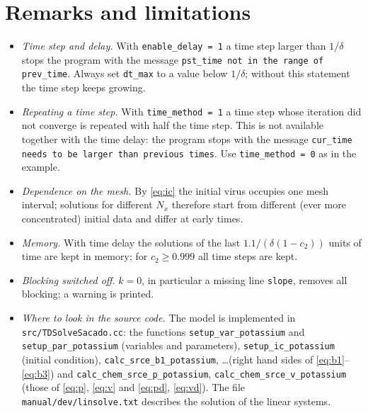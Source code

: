 \documentclass[11pt]{article}
\newcommand{\code}[1]{\texttt{#1}}
\begin{document}
\section{Remarks and limitations}
\label{sec:remarks}
\begin{itemize}
  \item \emph{Time step and delay.} With \code{enable\_delay = 1} a time step larger than $1/\delta$ stops the program with the message \code{pst\_time not in the range of prev\_time}. Always set \code{dt\_max} to a value below $1/\delta$; without this statement the time step keeps growing.
  \item \emph{Repeating a time step.} With \code{time\_method = 1} a time step whose iteration did not converge is repeated with half the time step. This is not available together with the time delay: the program stops with the message \code{cur\_time needs to be larger than previous times}. Use \code{time\_method = 0} as in the example.
  \item \emph{Dependence on the mesh.} By \eqref{eq:ic} the initial virus occupies one mesh interval; solutions for different $N_x$ therefore start from different (ever more concentrated) initial data and differ at early times.
  \item \emph{Memory.} With time delay the solutions of the last $1.1/(\delta(1-c_2))$ units of time are kept in memory; for $c_2\ge0.999$ all time steps are kept.
  \item \emph{Blocking switched off.} $k=0$, in particular a missing line \code{slope}, removes all blocking; a warning is printed.
  \item \emph{Where to look in the source code.} The model is implemented in \code{src/TDSolveSacado.cc}: the functions \code{setup\_var\_potassium} and \code{setup\_par\_potassium} (variables and parameters), \code{setup\_ic\_potassium} (initial condition), \code{calc\_srce\_b1\_potassium}, \ldots (right hand sides of \eqref{eq:b1}--\eqref{eq:b3}) and \code{calc\_chem\_srce\_p\_potassium}, \code{calc\_chem\_srce\_v\_potassium} (those of \eqref{eq:p}, \eqref{eq:v} and \eqref{eq:pd}, \eqref{eq:vd}). The file \code{manual/dev/linsolve.txt} describes the solution of the linear systems.
\end{itemize}
\end{document}
